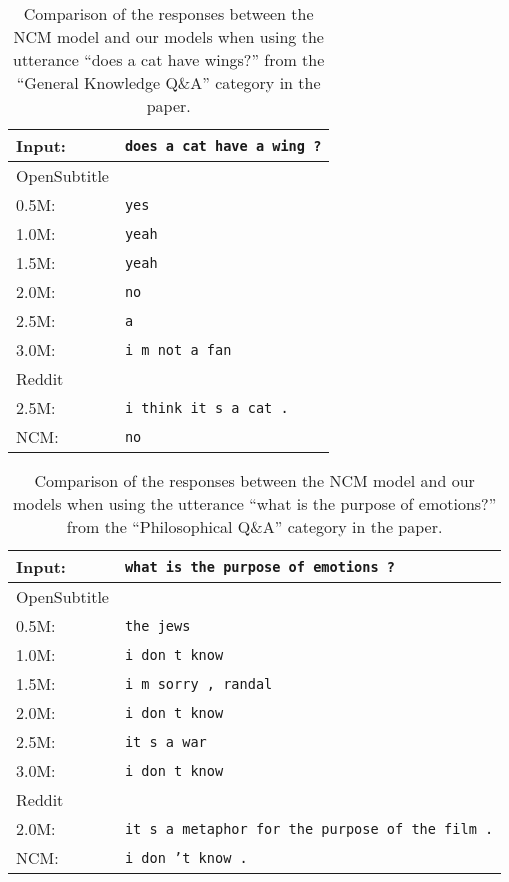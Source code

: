\begin{table}[H]
	\centering
	\begin{adjustbox}{max width=\textwidth}
		\begin{tabular}{ll}
			\toprule
			Input: 	& \texttt{does a cat have a wing ?}\\
			\midrule
			OpenSubtitle\\
			0.5M: 	& \texttt{yes}\\
			1.0M: 	& \texttt{yeah}\\
			1.5M:	& \texttt{yeah}\\
			2.0M:	& \texttt{no}\\
			2.5M:	& \texttt{a}\\
			3.0M:	& \texttt{i m not a fan}\\
			\midrule
			Reddit\\
			2.5M:	& \texttt{i think it s a cat .}\\
			\midrule
			NCM:	& \texttt{no}\\
			\bottomrule
		\end{tabular}
	\end{adjustbox}
	\caption{Comparison of the responses between the NCM model and our models when using the utterance ``does a cat have wings?'' from the ``General Knowledge Q\&A'' category in the paper.}
	\label{results:example17_output:Neural_Conversational_Model_compared}
\end{table}


\begin{table}[H]
	\centering
	\begin{adjustbox}{max width=\textwidth}
		\begin{tabular}{ll}
			\toprule
			Input: 	& \texttt{what is the purpose of emotions ?}\\
			\midrule
			OpenSubtitle\\
			0.5M: 	& \texttt{the jews}\\
			1.0M: 	& \texttt{i don t know}\\
			1.5M:	& \texttt{i m sorry , randal}\\
			2.0M:	& \texttt{i don t know}\\
			2.5M:	& \texttt{it s a war}\\
			3.0M:	& \texttt{i don t know}\\
			\midrule
			Reddit\\
			2.0M:	& \texttt{it s a metaphor for the purpose of the film .}\\
			\midrule
			NCM:	& \texttt{i don ’t know .}\\
			\bottomrule
		\end{tabular}
	\end{adjustbox}
	\caption{Comparison of the responses between the NCM model and our models when using the utterance ``what is the purpose of emotions?'' from the ``Philosophical Q\&A'' category in the paper.}
	\label{results:example17_output:Neural_Conversational_Model_compared}
\end{table}


